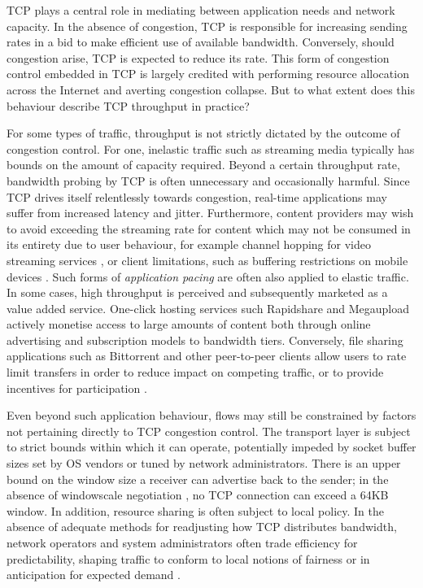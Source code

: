 %
%
%
%
%

TCP plays a central role in mediating between application needs and network capacity.
In the absence of congestion, TCP is responsible for increasing sending rates in a bid to make efficient use of available bandwidth.
Conversely, should congestion arise, TCP is expected to reduce its rate.
This form of congestion control embedded in TCP is largely credited with performing resource allocation across the Internet and averting congestion collapse.
But to what extent does this behaviour describe TCP throughput in practice?

For some types of traffic, throughput is not strictly dictated by the outcome of congestion control.
For one, inelastic traffic such as streaming media typically has bounds on the amount of capacity required.
Beyond a certain throughput rate, bandwidth probing by TCP is often unnecessary and occasionally harmful.
Since TCP drives itself relentlessly towards congestion, real-time applications may suffer from increased latency and jitter.
Furthermore, content providers may wish to avoid exceeding the streaming rate for content which may not be consumed in its entirety due to user behaviour, for example channel hopping for video streaming services \cite{iptvWorkload}, or client limitations, such as buffering restrictions on mobile devices \cite{Rao:2011p547}.
Such forms of \emph{application pacing} are often also applied to elastic traffic.
In some cases, high throughput is perceived and subsequently marketed as a value added service.
One-click hosting services such Rapidshare and Megaupload \cite{oneclick1, SanjuasCuxart:2012p588} actively monetise access to large amounts of content both through online advertising and subscription models to bandwidth tiers.
Conversely, file sharing applications such as Bittorrent and other peer-to-peer clients allow users to rate limit transfers in order to reduce impact on competing traffic, or to provide incentives for participation \cite{bittorrentIMC}.

Even beyond such application behaviour, flows may still be constrained by factors not pertaining directly to TCP congestion control.
The transport layer is subject to strict bounds within which it can operate, potentially impeded by socket buffer sizes set by OS vendors or tuned by network administrators. There is an upper bound on the window size a receiver can advertise back to the sender; in the absence of windowscale negotiation \cite{braden1989rfc}, no TCP connection can exceed a 64KB window. In addition, resource sharing is often subject to local policy.
In the absence of adequate methods for readjusting how TCP distributes bandwidth, network operators and system administrators often trade efficiency for predictability, shaping traffic to conform to local notions of fairness or in anticipation for expected demand \cite{ispTrafficShaping}.

